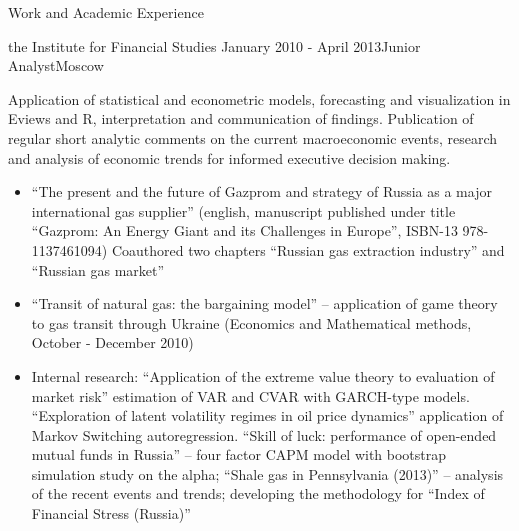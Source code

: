 \documentclass{resume} %
\begin{document}
\begin{rSection}{Work and Academic Experience}
\begin{rSubsection}{
        the Institute for Financial Studies
    }{January 2010 - April 2013}{Junior Analyst}{Moscow}
    \item Application of statistical and econometric models, forecasting and visualization in Eviews and R, interpretation and communication of findings. Publication of regular short analytic comments on the current macroeconomic events, research and analysis of economic trends for informed executive decision making.

    \begin{itemize}
        \item ``The present and the future of Gazprom and strategy of Russia as a major international gas supplier'' (english, manuscript published under title ``Gazprom: An Energy Giant and its Challenges in Europe'', ISBN-13 978-1137461094) Coauthored two chapters ``Russian gas extraction industry'' and ``Russian gas market''

        \item ``Transit of natural gas: the bargaining model'' -- application of game theory to gas transit through Ukraine (Economics and Mathematical methods, October - December 2010)

        \item Internal research: ``Application of the extreme value theory to evaluation of market risk'' estimation of VAR and CVAR with GARCH-type models. ``Exploration of latent volatility regimes in oil price dynamics'' application of Markov Switching autoregression. ``Skill of luck: performance of open-ended mutual funds in Russia'' -- four factor CAPM model with bootstrap simulation study on the alpha; ``Shale gas in Pennsylvania (2013)'' -- analysis of the recent events and trends; developing the methodology for ``Index of Financial Stress (Russia)''

    \end{itemize}
\end{rSubsection}
\end{rSection}
\end{document}
